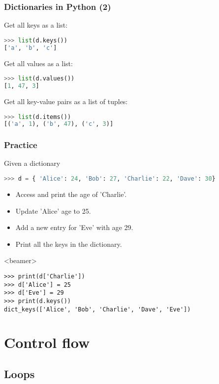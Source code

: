 \begin{frame}[fragile]
  \frametitle{Dictionaries in Python (2)}
  Get all keys as a list:
  \begin{lstlisting}[language=Python,numbers=none]
>>> list(d.keys())
['a', 'b', 'c']
  \end{lstlisting}
  Get all values as a list:
  \begin{lstlisting}[language=Python,numbers=none]
>>> list(d.values())
[1, 47, 3]
  \end{lstlisting}
  Get all key-value pairs as a list of tuples:
  \begin{lstlisting}[language=Python,numbers=none]
>>> list(d.items())
[('a', 1), ('b', 47), ('c', 3)]
  \end{lstlisting}
\end{frame}

\begin{frame}[fragile]
  \frametitle{Practice}
  Given a dictionary
  \begin{lstlisting}[language=Python,numbers=none]
>>> d = { 'Alice': 24, 'Bob': 27, 'Charlie': 22, 'Dave': 30}
  \end{lstlisting}
  \begin{itemize}
   \item Access and print the age of 'Charlie'.
   \item Update 'Alice' age to 25.
   \item Add a new entry for 'Eve' with age 29.
   \item Print all the keys in the dictionary.
  \end{itemize}\pause
  \begin{onlyenv}<beamer>
    \begin{lstlisting}[]
>>> print(d['Charlie'])
>>> d['Alice'] = 25
>>> d['Eve'] = 29
>>> print(d.keys())
dict_keys(['Alice', 'Bob', 'Charlie', 'Dave', 'Eve'])
    \end{lstlisting}
  \end{onlyenv}
 \end{frame}

 \section{Control flow}
 \subsection{Loops}
 
